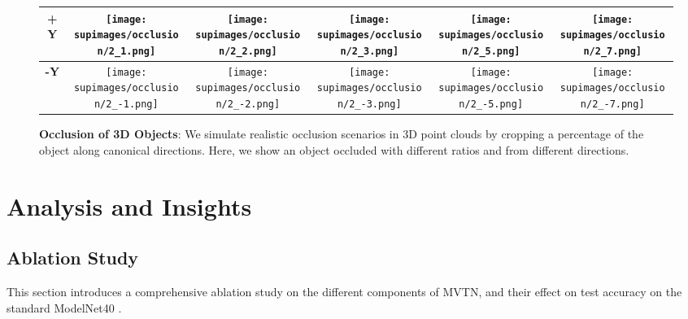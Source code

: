 \documentclass[10pt,twocolumn,letterpaper]{article}
\begin{document}
\begin{figure*} []
{\begin{tabular}{c|ccccc}
\textbf{+Y} &
\texttt{[image: supimages/occlusion/2\_1.png]} &
\texttt{[image: supimages/occlusion/2\_2.png]} &
\texttt{[image: supimages/occlusion/2\_3.png]} &
\texttt{[image: supimages/occlusion/2\_5.png]} &
\texttt{[image: supimages/occlusion/2\_7.png]} \\ \hline

\textbf{-Y} &
\texttt{[image: supimages/occlusion/2\_-1.png]} &
\texttt{[image: supimages/occlusion/2\_-2.png]} &
\texttt{[image: supimages/occlusion/2\_-3.png]} &
\texttt{[image: supimages/occlusion/2\_-5.png]} &
\texttt{[image: supimages/occlusion/2\_-7.png]} \\ \hline

 \bottomrule
\end{tabular}
}
\vspace{2pt}
\caption{\small \textbf{Occlusion of 3D Objects}: We simulate realistic occlusion scenarios in 3D point clouds by cropping a percentage of the object along canonical directions. Here, we show an object occluded with different ratios and from different directions. 
}
    \label{fig:occlusion-supp}
\end{figure*}




 



\clearpage \clearpage
\section{Analysis and Insights}

\subsection{Ablation Study} \label{sec:ablation-supp}
This section introduces a comprehensive ablation study on the different components of MVTN, and their effect on test accuracy on the standard ModelNet40 \cite{modelnet}.
\end{document}
